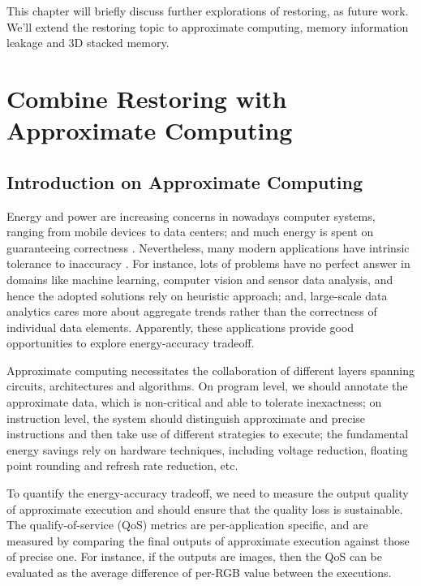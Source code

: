 This chapter will briefly discuss further explorations of restoring, as future work. We'll extend the restoring topic to approximate computing, memory information leakage and 3D stacked memory.

\section{Combine Restoring with Approximate Computing} \label{work:approx}
\subsection{Introduction on Approximate Computing}
Energy and power are increasing concerns in nowadays computer systems, ranging from mobile devices to data centers; and much energy is spent on guaranteeing correctness \cite{PLDI11:enerj}.
Nevertheless, many modern applications have intrinsic tolerance to inaccuracy \cite{ISCA10:relax, PLDI11:enerj}. For instance, lots of problems have no perfect answer in domains like machine learning, computer vision and sensor data analysis, and hence the adopted solutions rely on heuristic approach; and, large-scale data analytics cares more about aggregate trends rather than the correctness of individual data elements. Apparently, these applications provide good opportunities to explore energy-accuracy tradeoff.

Approximate computing necessitates the collaboration of different layers spanning circuits, architectures and algorithms. On program level, we should annotate the approximate data, which is non-critical and able to tolerate inexactness; on instruction level, the system should distinguish approximate and precise instructions and then take use of different strategies to execute; the fundamental energy savings rely on hardware techniques, including voltage reduction, floating point rounding and refresh rate reduction, etc.

To quantify the energy-accuracy tradeoff, we need to measure the output quality of approximate execution and should ensure that the quality loss is sustainable.
The qualify-of-service (QoS) metrics are per-application specific, and are measured by comparing the final outputs of approximate execution against those of precise one.
For instance, if the outputs are images, then the QoS can be evaluated as the average difference of per-RGB value \cite{PLDI11:enerj} between the executions.

